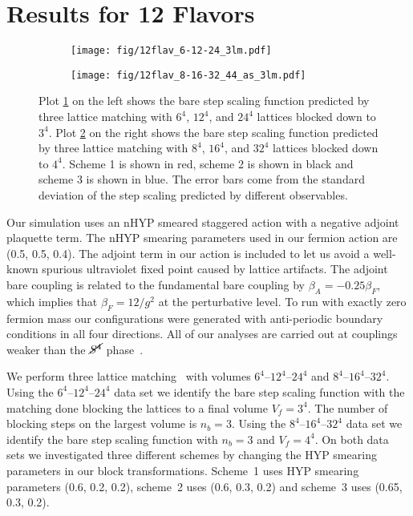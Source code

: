 \documentclass{PoS}
\newcommand{\Sb}{\ensuremath{\cancel{S^4}} }
\newcommand{\Sb}{\ensuremath{\cancel{S^4}} }
\newcommand{\TODO}[1]{\textcolor{red}{{\bf #1}}}
\begin{document}
\section{Results for 12 Flavors}
\label{sec:results}
\begin{figure}[h]
  \centering
  \begin{subfigure}[b]{0.48\textwidth}
    \texttt{[image: fig/12flav\_6-12-24\_3lm.pdf]}
    \label{fig:6-12-24_33}
  \end{subfigure}
  \begin{subfigure}[b]{0.48\textwidth}
    \texttt{[image: fig/12flav\_8-16-32\_44\_as\_3lm.pdf]}
    \label{fig:8-16-32_44}
  \end{subfigure}
  \caption{Plot \ref{fig:6-12-24_33} on the left shows the bare step scaling function predicted by three lattice matching with $6^4$, $12^4$, and $24^4$ lattices blocked down to $3^4$.  Plot \ref{fig:8-16-32_44} on the right shows the bare step scaling function predicted by three lattice matching with $8^4$, $16^4$, and $32^4$ lattices blocked down to $4^4$.  Scheme 1 is shown in red, scheme 2 is shown in black and scheme 3 is shown in blue.  The error bars come from the standard deviation of the step scaling predicted by different observables.}
\label{fig:multischeme}
\end{figure}

Our simulation uses an nHYP smeared staggered action with a negative adjoint plaquette term.
The nHYP smearing parameters used in our fermion action are (0.5, 0.5, 0.4).
The adjoint term in our action is included to let us avoid a well-known spurious ultraviolet fixed point caused by lattice artifacts.
The adjoint bare coupling is related to the fundamental bare coupling by $\beta_A = -0.25\beta_F$, which implies that $\beta_F = 12 / g^2$ at the perturbative level.
To run with exactly zero fermion mass our configurations were generated with anti-periodic boundary conditions in all four directions.
All of our analyses are carried out at couplings weaker than the \Sb phase~\TODO{\cite{}}.

We perform three lattice matching~\TODO{\cite{}} with volumes $6^4$--$12^4$--$24^4$ and $8^4$--$16^4$--$32^4$.
Using the $6^4$--$12^4$--$24^4$ data set we identify the bare step scaling function with the matching done blocking the lattices to a final volume $V_f = 3^4$.
The number of blocking steps on the largest volume is $n_b = 3$.
Using the $8^4$--$16^4$--$32^4$ data set we identify the bare step scaling function with $n_b = 3$ and $V_f = 4^4$.
On both data sets we investigated three different schemes by changing the HYP smearing parameters in our block transformations.
Scheme~1 uses HYP smearing parameters (0.6, 0.2, 0.2), scheme~2 uses (0.6, 0.3, 0.2) and scheme~3 uses (0.65, 0.3, 0.2).
\end{document}

